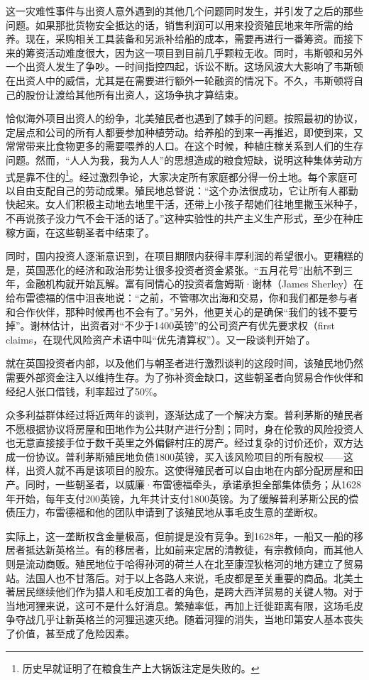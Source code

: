 \documentclass[12pt,oneside]{book}
\begin{document}
\begin{bookref}[frametitle={\cite{美国四百年}}]
这一灾难性事件与出资人意外遇到的其他几个问题同时发生，并引发了之后的那些问题。如果那批货物安全抵达的话，销售利润可以用来投资殖民地来年所需的给养。现在，采购相关工具装备和另派补给船的成本，需要再进行一番筹资。而接下来的筹资活动难度很大，因为这一项目到目前几乎颗粒无收。同时，韦斯顿和另外一个出资人发生了争吵。一时间指控四起，诉讼不断。这场风波大大影响了韦斯顿在出资人中的威信，尤其是在需要进行额外一轮融资的情况下。不久，韦斯顿将自己的股份让渡给其他所有出资人，这场争执才算结束。

恰似海外项目出资人的纷争，北美殖民者也遇到了棘手的问题。按照最初的协议，定居点和公司的所有人都要参加种植劳动。给养船的到来一再推迟，即使到来，又常常带来比食物更多的需要喂养的人口。在这个时候，种植庄稼关系到人们的生存问题。然而，“人人为我，我为人人”的思想造成的粮食短缺，说明这种集体劳动方式是靠不住的\footnote{历史早就证明了在粮食生产上大锅饭注定是失败的。}。经过激烈争论，大家决定所有家庭都分得一份土地。每个家庭可以自由支配自己的劳动成果。殖民地总督说：“这个办法很成功，它让所有人都勤快起来。女人们积极主动地去地里干活，还带上小孩子帮她们往地里撒玉米种子，不再说孩子没力气不会干活的话了。”这种实验性的共产主义生产形式，至少在种庄稼方面，在这些朝圣者中结束了。

同时，国内投资人逐渐意识到，在项目期限内获得丰厚利润的希望很小。更糟糕的是，英国恶化的经济和政治形势让很多投资者资金紧张。“五月花号”出航不到三年，金融机构就开始瓦解。富有同情心的投资者詹姆斯·谢林（James Sherley）在给布雷德福的信中沮丧地说：“之前，不管哪次出海和交易，你和我们都是参与者和合作伙伴，那种时候再也不会有了。”另外，他更关心的是确保“我们的钱不要亏掉”。谢林估计，出资者对“不少于1400英镑”的公司资产有优先要求权（first claims，在现代风险资产术语中叫“优先清算权”）。又一段谈判开始了。

就在英国投资者内部，以及他们与朝圣者进行激烈谈判的这段时间，该殖民地仍然需要外部资金注入以维持生存。为了弥补资金缺口，这些朝圣者向贸易合作伙伴和经纪人张口借钱，利率超过了50\%。

众多利益群体经过将近两年的谈判，逐渐达成了一个解决方案。普利茅斯的殖民者不愿根据协议将房屋和田地作为公共财产进行分割；同时，身在伦敦的风险投资人也无意直接接手位于数千英里之外偏僻村庄的房产。经过复杂的讨价还价，双方达成一份协议。普利茅斯殖民地负债1800英镑，买入该风险项目的所有股权——这样，出资人就不再是该项目的股东。这使得殖民者可以自由地在内部分配房屋和田产。同时，一些朝圣者，以威廉·布雷德福牵头，承诺承担全部集体债务；从1628年开始，每年支付200英镑，九年共计支付1800英镑。为了缓解普利茅斯公民的偿债压力，布雷德福和他的团队申请到了该殖民地从事毛皮生意的垄断权。

实际上，这一垄断权含金量极高，但前提是没有竞争。到1628年，一船又一船的移居者抵达新英格兰。有的移居者，比如前来定居的清教徒，有宗教倾向，而其他人则是流动商贩。殖民地位于哈得孙河的荷兰人在北至康涅狄格河的地方建立了贸易站。法国人也不甘落后。对于以上各路人来说，毛皮都是至关重要的商品。北美土著居民继续他们作为猎人和毛皮加工者的角色，是跨大西洋贸易的关键人物。对于当地河狸来说，这可不是什么好消息。繁殖率低，再加上迁徙距离有限，这场毛皮争夺战几乎让新英格兰的河狸迅速灭绝。随着河狸的消失，当地印第安人基本丧失了价值，甚至成了危险因素。


\end{bookref}
\end{document}
